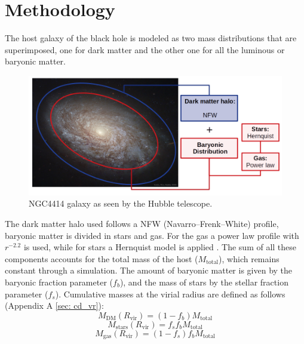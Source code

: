 
%





\chapter{Methodology}\label{ch: methodology}
	The host galaxy of the black hole is modeled as two mass distributions that are superimposed, one for dark matter and the other one for all the luminous or baryonic matter.
	\begin{figure}[h]
		\centering
		\includegraphics[width=0.8\linewidth]{Figures/NGC4414_modified}
		\caption{NGC4414 galaxy as seen by the Hubble telescope.}
	\end{figure}
	
	The dark matter halo used follows a NFW (Navarro–Frenk–White) profile, baryonic matter is divided in stars and gas. For the gas a power law profile with $r^{-2.2}$ is used, while for stars a Hernquist model is applied \cite{tanaka2009assembly, choksi2017recoiling}. The sum of all these components accounts for the total mass of the host ($M_\text{total}$), which remains constant through a simulation. The amount of baryonic matter is given by the baryonic fraction parameter ($f_b$), and the mass of stars by the stellar fraction parameter ($f_s$). Cumulative masses at the virial radius are defined as follows (Appendix A \autoref{sec: cd_vr}):
	\begin{equation}
		M_\text{DM}(R_\text{vir}) = (1 - f_b)M_\text{total}
	\end{equation}
	\begin{equation}
		M_\text{stars}(R_\text{vir}) = f_sf_bM_\text{total}
	\end{equation}
	\begin{equation}
		M_\text{gas}(R_\text{vir}) = (1 - f_s)f_bM_\text{total}
	\end{equation}
	
